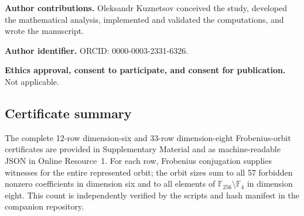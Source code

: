 \documentclass[pdflatex,sn-mathphys-num]{sn-jnl}
\theoremstyle{thmstyleone}
\theoremstyle{thmstyletwo}
\theoremstyle{thmstylethree}
\newcommand{\F}{\mathbb F}
\begin{document}
\textbf{Author contributions.} Oleksandr Kuznetsov conceived the study, developed the mathematical analysis, implemented and validated the computations, and wrote the manuscript.

\textbf{Author identifier.} ORCID: 0000-0003-2331-6326.

\textbf{Ethics approval, consent to participate, and consent for publication.} Not applicable.

\begin{appendices}
\section{Certificate summary}\label{app:certs}
The complete 12-row dimension-six and 33-row dimension-eight Frobenius-orbit certificates are provided in Supplementary Material and as machine-readable JSON in Online Resource~1. For each row, Frobenius conjugation supplies witnesses for the entire represented orbit; the orbit sizes sum to all 57 forbidden nonzero coefficients in dimension six and to all elements of $\F_{256}\setminus\F_4$ in dimension eight. This count is independently verified by the scripts and hash manifest in the companion repository.
\end{appendices}


\end{document}
